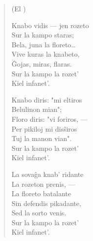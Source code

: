 \begin{verse}
\begin{center}
\footnotesize (El )
\end{center}

                    Knabo vidis --- jen rozeto\\
                    Sur la kampo staras;\\
                    Bela, juna la floreto\dots\\
                    Vive kuras la knabeto,\\
                    \^Gojas, miras, flaras.\\
                    Sur la kampo la rozet'\\
                    Kiel infanet'.

                     \vin    Knabo diris: "mi eltiros\\
                      \vin   Belulinon mian";\\
                      \vin   Floro diris: "vi foriros, ---\\
                     \vin    Per pikiloj mi dis\^siros\\
                     \vin    Tuj la manon vian".\\
                      \vin   Sur la kampo la rozet'\\
                      \vin   Kiel infanet'.

                    La sova\^ga knab' ridante\\
                    La rozeton prenis, ---\\
                    La floreto batalante\\
                    Sin defendis pikadante,\\
                    Sed la sorto venis.\\
                    Sur la kampo la rozet'\\
                    Kiel infanet'.

\end{verse}

\smallrule{}